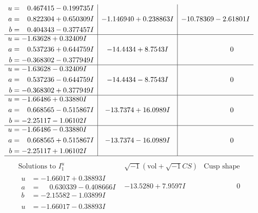 \documentclass[1p]{elsarticle_modified}
\theoremstyle{definition}
\newcommand{\I}{\sqrt{-1}}
\begin{document}
$$\begin{array}{c|c|c}
\begin{aligned}
u &= \phantom{-}0.467415 - 0.199735 I \\
a &= \phantom{-}0.822304 + 0.650309 I \\
b &= \phantom{-}0.404343 - 0.377457 I\end{aligned}
 & -1.146940 + 0.238863 I & -10.78369 - 2.61801 I \\ \hline\begin{aligned}
u &= -1.63628 + 0.32409 I \\
a &= \phantom{-}0.537236 + 0.644759 I \\
b &= -0.368302 - 0.377949 I\end{aligned}
 & -14.4434 + 8.7543 I & \phantom{-0.000000 } 0 \\ \hline\begin{aligned}
u &= -1.63628 - 0.32409 I \\
a &= \phantom{-}0.537236 - 0.644759 I \\
b &= -0.368302 + 0.377949 I\end{aligned}
 & -14.4434 - 8.7543 I & \phantom{-0.000000 } 0 \\ \hline\begin{aligned}
u &= -1.66486 + 0.33880 I \\
a &= \phantom{-}0.668565 - 0.515867 I \\
b &= -2.25117 - 1.06102 I\end{aligned}
 & -13.7374 + 16.0989 I & \phantom{-0.000000 } 0 \\ \hline\begin{aligned}
u &= -1.66486 - 0.33880 I \\
a &= \phantom{-}0.668565 + 0.515867 I \\
b &= -2.25117 + 1.06102 I\end{aligned}
 & -13.7374 - 16.0989 I & \phantom{-0.000000 } 0\\
 \hline 
 \end{array}$$\newpage$$\begin{array}{c|c|c}  
\text{Solutions to }I^u_{1}& \I (\text{vol} + \sqrt{-1}CS) & \text{Cusp shape}\\
 \hline 
\begin{aligned}
u &= -1.66017 + 0.38893 I \\
a &= \phantom{-}0.630339 - 0.408666 I \\
b &= -2.15582 - 1.03899 I\end{aligned}
 & -13.5280 + 7.9597 I & \phantom{-0.000000 } 0 \\ \hline\begin{aligned}
u &= -1.66017 - 0.38893 I \\

\end{aligned}
\end{array}$$
\end{document}
